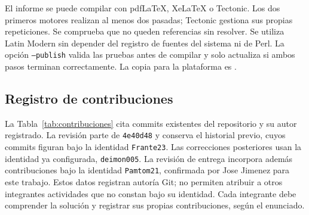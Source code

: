 El informe se puede compilar con pdfLaTeX, XeLaTeX o Tectonic. Los dos primeros motores realizan al menos dos pasadas; Tectonic gestiona sus propias repeticiones. Se comprueba que no queden referencias sin resolver. Se utiliza Latin Modern sin depender del registro de fuentes del sistema ni de Perl. La opción \texttt{--publish} valida las pruebas antes de compilar y solo actualiza  si ambos pasos terminan correctamente. La copia para la plataforma es .

\subsection{Registro de contribuciones}

La Tabla~\ref{tab:contribuciones} cita commits existentes del repositorio y su autor registrado. La revisión parte de \texttt{4e40d48} y conserva el historial previo, cuyos commits figuran bajo la identidad \texttt{Frante23}. Las correcciones posteriores usan la identidad ya configurada, \texttt{deimon005}. La revisión de entrega incorpora además contribuciones bajo la identidad \texttt{Pamtom21}, confirmada por Jose Jimenez para este trabajo. Estos datos registran autoría Git; no permiten atribuir a otros integrantes actividades que no constan bajo su identidad. Cada integrante debe comprender la solución y registrar sus propias contribuciones, según el enunciado.

